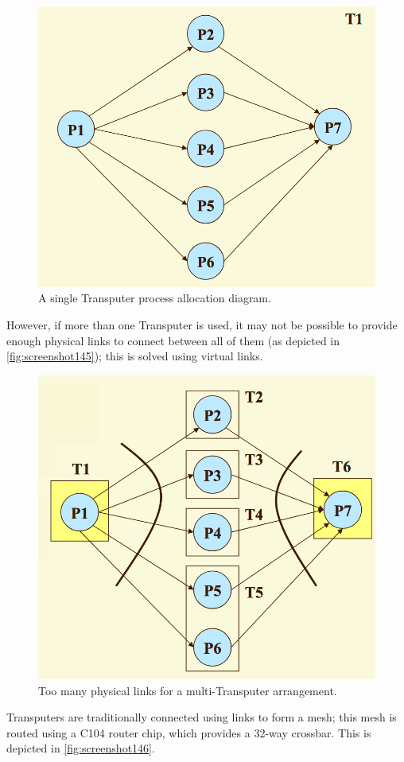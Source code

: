 \begin{figure}
\centering
\includegraphics[width=0.7\linewidth]{screenshot144}
\caption{A single Transputer process allocation diagram.}
\label{fig:screenshot144}
\end{figure}

However, if more than one Transputer is used, it may not be possible to provide enough physical links to connect between all of them (as depicted in \autoref{fig:screenshot145}); this is solved using virtual links.

\begin{figure}
\centering
\includegraphics[width=0.7\linewidth]{screenshot145}
\caption{Too many physical links for a multi-Transputer arrangement.}
\label{fig:screenshot145}
\end{figure}

Transputers are traditionally connected using links to form a mesh; this mesh is routed using a C104 router chip, which provides a 32-way crossbar. This is depicted in \autoref{fig:screenshot146}.


